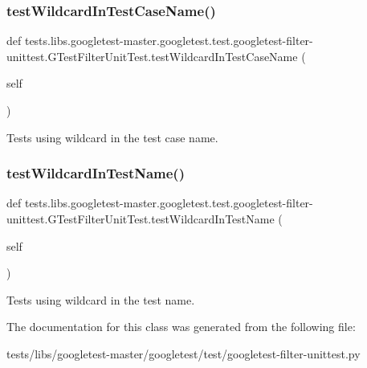 \subsubsection{\texorpdfstring{test\+Wildcard\+In\+Test\+Case\+Name()}{testWildcardInTestCaseName()}}
{\footnotesize\ttfamily def tests.\+libs.\+googletest-\/master.\+googletest.\+test.\+googletest-\/filter-\/unittest.\+G\+Test\+Filter\+Unit\+Test.\+test\+Wildcard\+In\+Test\+Case\+Name (\begin{DoxyParamCaption}\item[{}]{self }\end{DoxyParamCaption})}

\begin{DoxyVerb}Tests using wildcard in the test case name.\end{DoxyVerb}
 \mbox{\label{classtests_1_1libs_1_1googletest-master_1_1googletest_1_1test_1_1googletest-filter-unittest_1_1GTestFilterUnitTest_a718fd31cea60c4bc2649152f92fe2431}} 
\subsubsection{\texorpdfstring{test\+Wildcard\+In\+Test\+Name()}{testWildcardInTestName()}}
{\footnotesize\ttfamily def tests.\+libs.\+googletest-\/master.\+googletest.\+test.\+googletest-\/filter-\/unittest.\+G\+Test\+Filter\+Unit\+Test.\+test\+Wildcard\+In\+Test\+Name (\begin{DoxyParamCaption}\item[{}]{self }\end{DoxyParamCaption})}

\begin{DoxyVerb}Tests using wildcard in the test name.\end{DoxyVerb}
 

The documentation for this class was generated from the following file\+:\begin{DoxyCompactItemize}
\item 
tests/libs/googletest-\/master/googletest/test/googletest-\/filter-\/unittest.\+py\end{DoxyCompactItemize}

